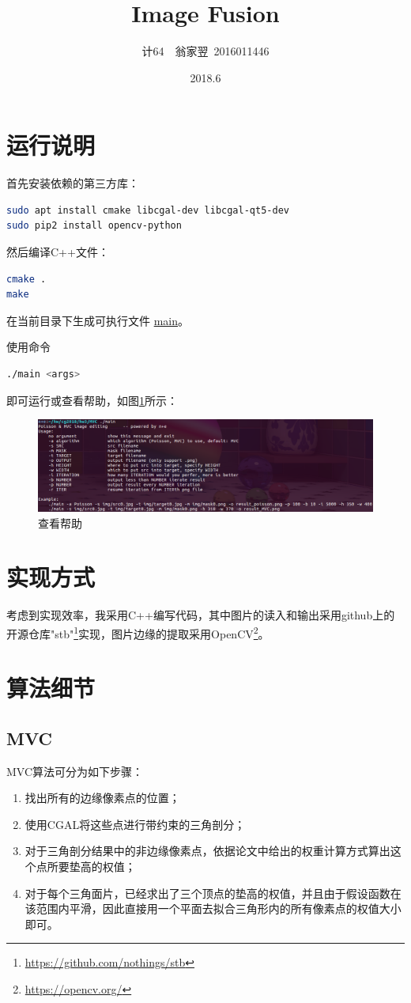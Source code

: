 \documentclass[a4paper]{article}
\title{\bf Image Fusion}
\date{2018.6}
\author{计64~~翁家翌~2016011446}
\begin{document}
\kaishu
\ttfamily
\maketitle
\tableofcontents
\newpage

\section{运行说明}
首先安装依赖的第三方库：
\begin{lstlisting}[language=bash]
sudo apt install cmake libcgal-dev libcgal-qt5-dev
sudo pip2 install opencv-python
\end{lstlisting}

然后编译C++文件：
\begin{lstlisting}[language=bash]
cmake .
make
\end{lstlisting}
在当前目录下生成可执行文件 \underline{main}。

使用命令
\begin{lstlisting}[language=bash]
./main <args>
\end{lstlisting}
即可运行或查看帮助，如图\ref{fig:2-1}所示：
\begin{figure}[htp]
\centering
\includegraphics[width=1\linewidth]{2_1.png}
\caption{查看帮助}
\label{fig:2-1}
\end{figure}

\section{实现方式}

考虑到实现效率，我采用C++编写代码，其中图片的读入和输出采用github上的开源仓库"stb"\footnote{\url{https://github.com/nothings/stb}}实现，图片边缘的提取采用OpenCV\footnote{\url{https://opencv.org/}}。

\section{算法细节}
\subsection{MVC}
MVC\cite{MVC,MVC2}算法可分为如下步骤：
\begin{enumerate}
	\item 找出所有的边缘像素点的位置；
	\item 使用CGAL将这些点进行带约束的三角剖分；
	\item 对于三角剖分结果中的非边缘像素点，依据论文中给出的权重计算方式算出这个点所要垫高的权值；
	\item 对于每个三角面片，已经求出了三个顶点的垫高的权值，并且由于假设函数在该范围内平滑，因此直接用一个平面去拟合三角形内的所有像素点的权值大小即可。
\end{enumerate}
\end{document}
